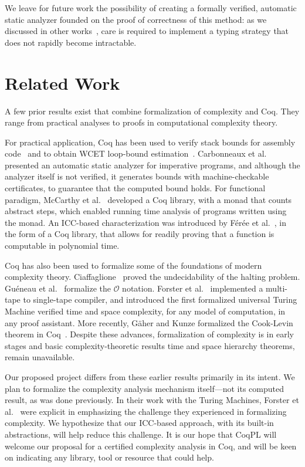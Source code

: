 We leave for future work the possibility of creating a formally verified, automatic static analyzer founded on the proof of correctness of this method: as we discussed in other works~\cite{aubert2023b,aubert20222}, care is required to implement a typing strategy that does not rapidly become intractable.

\tocless\section{Related Work}\label{coqpl-related}

A few prior results exist that combine formalization of complexity and Coq.
They range from practical analyses to proofs in computational complexity theory.

For practical application, Coq has been used to verify stack bounds for assembly code~\cite{carbonneaux2014}
and to obtain WCET loop-bound estimation~\cite{blazy2013}.
Carbonneaux et al. ~\cite{carbonneaux2017} presented an automatic static analyzer for imperative programs, and although the analyzer itself is not verified, it generates bounds with machine-checkable certificates, to guarantee that the computed bound holds.
For functional paradigm, McCarthy et al.~\cite{mccarthy2018} developed a Coq library, with a monad that counts abstract steps, which enabled running time analysis of programs written using the monad.
An ICC-based characterization was introduced by F\'{e}r\'{e}e et al.~\cite{feree2018}, in the form of a
Coq library, that allows for readily proving that a function is computable in polynomial time. %

Coq has also been used to formalize some of the foundations of modern complexity theory.
Ciaffaglione~\cite{ciaffaglione2016} proved the undecidability of the halting problem.
Gu{\'e}neau et al.~\cite{gueneau2018} formalize the \(\mathcal{O}\) notation.
Forster et al.~\cite{forster2020} implemented a multi-tape to single-tape compiler, and
introduced the first formalized universal Turing Machine verified \wrt time and space complexity, for any model of computation, in any proof assistant.
More recently, G\"{a}her and Kunze formalized the Cook-Levin theorem in Coq~\cite{gaher2021}.
Despite these advances, formalization of complexity is in early stages and basic complexity-theoretic
results \eg time and space hierarchy theorems, remain unavailable.

Our proposed project differs from these earlier results primarily in its intent.
We plan to formalize the complexity analysis mechanism itself---not its computed result, as was done previously.
In their work with the Turing Machines, Forster et al.~\cite{forster2020} were explicit
in emphasizing the challenge they experienced in formalizing complexity.
We hypothesize that our ICC-based approach, with \eg its built-in abstractions, will help reduce this challenge.
It is our hope that CoqPL will welcome our proposal for a certified complexity analysis in Coq, and will be keen on indicating any library, tool or resource that could help.
